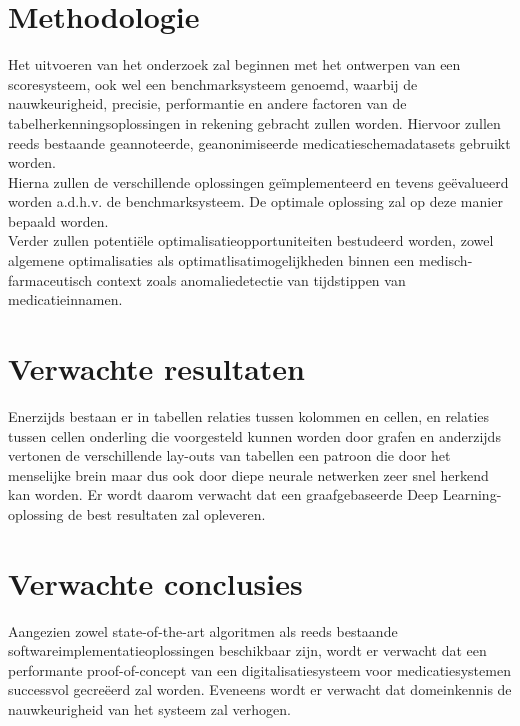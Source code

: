 \section{Methodologie}
\label{sec:methodologie}

Het uitvoeren van het onderzoek zal beginnen met het ontwerpen van een scoresysteem, ook wel een benchmarksysteem genoemd, waarbij de nauwkeurigheid, precisie, performantie en andere factoren van de tabelherkenningsoplossingen in rekening gebracht zullen worden. Hiervoor zullen reeds bestaande geannoteerde, geanonimiseerde medicatieschemadatasets gebruikt worden. \\

\noindent Hierna zullen de verschillende oplossingen geïmplementeerd en tevens geëvalueerd worden a.d.h.v. de benchmarksysteem. De optimale oplossing zal op deze manier bepaald worden.\\

\noindent Verder zullen potentiële optimalisatieopportuniteiten bestudeerd worden, zowel algemene optimalisaties als optimatlisatimogelijkheden binnen een medisch-farmaceutisch context zoals anomaliedetectie van tijdstippen van medicatieinnamen.

\section{Verwachte resultaten}
\label{sec:verwachte_resultaten}

Enerzijds bestaan er in tabellen relaties tussen kolommen en cellen, en relaties tussen cellen onderling die voorgesteld kunnen worden door grafen en anderzijds vertonen de verschillende lay-outs van tabellen een patroon die door het menselijke brein maar dus ook door diepe neurale netwerken zeer snel herkend kan worden. Er wordt daarom verwacht dat een graafgebaseerde Deep Learning-oplossing de best resultaten zal opleveren.

\section{Verwachte conclusies}
\label{sec:verwachte_conclusies}

Aangezien zowel state-of-the-art algoritmen als reeds bestaande softwareimplementatieoplossingen beschikbaar zijn, wordt er verwacht dat een performante proof-of-concept van een digitalisatiesysteem voor medicatiesystemen successvol gecreëerd zal worden. Eveneens wordt er verwacht dat domeinkennis de nauwkeurigheid van het systeem zal verhogen. 

